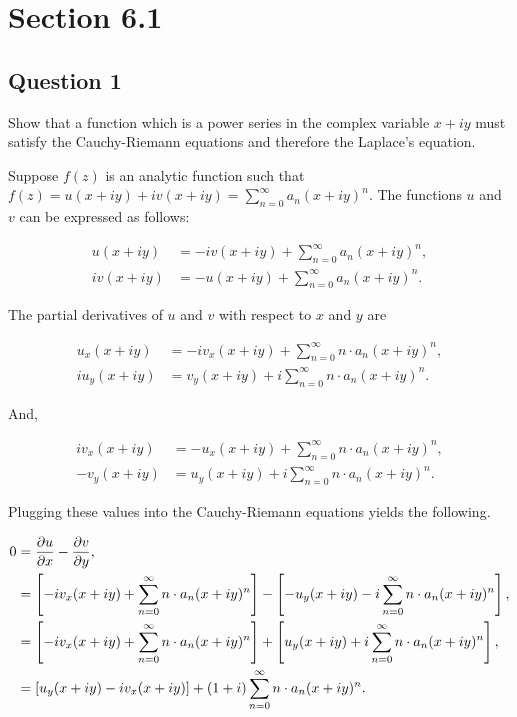 \documentclass[a4paper, 10pt]{article}
\newenvironment{answer}[1][Answer]{\begin{trivlist}
\item[\hskip\labelsep{\textit{#1.}}]}{\end{trivlist}}
\begin{document}
\raggedcolumns{}
\tableofcontents

\section{Section 6.1}

\subsection{Question 1}

Show that a function which is a power series in the complex variable $x+iy$ must satisfy the Cauchy-Riemann equations and therefore the Laplace's equation.

\begin{answer}
    Suppose $f(z)$ is an analytic function such that $f(z) = u(x+i y) + i v(x + i y) = \sum_{n=0}^\infty a_n (x + i y)^n$. The functions $u$ and $v$ can be expressed as follows:
    
    \begin{align*}
        u(x+i y) &= - i v(x + i y) + \sum_{n=0}^\infty a_n (x+ i y)^n,\\
        i v(x + i y) &= - u(x + i y) + \sum_{n=0}^\infty a_n (x + i y)^n. 
    \end{align*}

    The partial derivatives of $u$ and $v$ with respect to $x$ and $y$ are

    \begin{align*}
        u_x(x + i y) &= - i v_x (x + i y) + \sum_{n=0}^\infty n \cdot a_n (x + i y)^n,\\
        i u_y(x + i y) &= v_y (x + i y) + i \sum_{n=0}^\infty n \cdot a_n (x + i y)^n.
    \end{align*}

    And,

    \begin{align*}
        i v_x (x + i y) &= - u_x(x+ i y) + \sum_{n=0}^\infty n \cdot a_n (x + i y)^n,\\
        - v_y (x + i y) &= u_y (x + i y) + i \sum_{n=0}^\infty n \cdot a_n (x + i y)^n. 
    \end{align*}

    Plugging these values into the Cauchy-Riemann equations yields the following.

    \begin{align*}
        0   &= \partialderivative{u}{x} - \partialderivative{v}{y},\\
            &= \left[- i v_x (x + i y) + \sum_{n=0}^\infty n \cdot a_n (x + i y)^n \right]
            - \left[ - u_y (x + i y) - i \sum_{n=0}^\infty n \cdot a_n (x + i y)^n  \right],\\
            &= \left[- i v_x (x + i y) + \sum_{n=0}^\infty n \cdot a_n (x + i y)^n \right]
            + \left[ u_y (x + i y) + i \sum_{n=0}^\infty n \cdot a_n (x + i y)^n  \right],\\
            &=   \left[ u_y (x+ iy ) - i v_x(x + iy ) \right] + (1 + i) \sum_{n=0}^\infty n \cdot a_n (x + i y)^n.
    \end{align*}


\end{answer}
\end{document}
